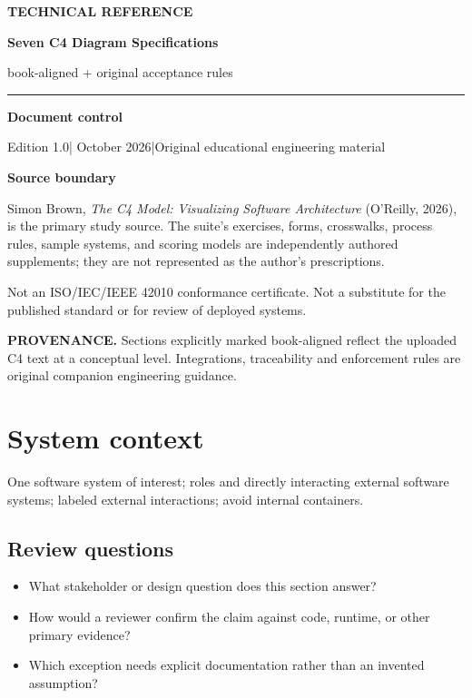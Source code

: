 \documentclass[10pt,letterpaper]{article}
\newcommand{\SourceNote}[1]{\par\smallskip\noindent\colorbox{C4Light}{\parbox{0.94\linewidth}{\footnotesize\textbf{PROVENANCE.} #1}}\par\medskip}
\newcommand{\DocStart}[3]{%
\begin{document}
\begin{titlepage}
\renewcommand{\thepage}{title-\arabic{page}}
\vspace*{0.55in}
{\sffamily\bfseries\small\color{C4Teal}#1}\par\vspace{0.24in}
{\sffamily\bfseries\fontsize{26}{31}\selectfont\color{C4Navy}#2}\par\vspace{0.18in}
{\large\color{C4Gray}#3}\par\vspace{0.4in}
\textcolor{C4Teal}{\rule{\linewidth}{1.15pt}}\par\vspace{0.24in}
\textbf{Document control}\par
Edition 1.0\quad|\quad 30 October 2026\quad|\quad Original educational engineering material\par
\vspace{0.17in}
\textbf{Source boundary}\par
Simon Brown, \emph{The C4 Model: Visualizing Software Architecture} (O'Reilly, 2026), is the primary study source. The suite's exercises, forms, crosswalks, process rules, sample systems, and scoring models are independently authored supplements; they are not represented as the author's prescriptions.\par
\vfill
{\small\color{C4Gray}Not an ISO/IEC/IEEE 42010 conformance certificate. Not a substitute for the published standard or for review of deployed systems.}\par
\end{titlepage}
}
\DocStart{TECHNICAL REFERENCE}{Seven C4 Diagram Specifications}{book-aligned + original acceptance rules}
\tableofcontents\clearpage
\SourceNote{Sections explicitly marked book-aligned reflect the uploaded C4 text at a conceptual level. Integrations, traceability and enforcement rules are original companion engineering guidance.}
\section{System context}
One software system of interest; roles and directly interacting external software systems; labeled external interactions; avoid internal containers.


\subsection{Review questions}
\begin{itemize}
\item What stakeholder or design question does this section answer?
\item How would a reviewer confirm the claim against code, runtime, or other primary evidence?
\item Which exception needs explicit documentation rather than an invented assumption?
\end{itemize}
\end{document}
